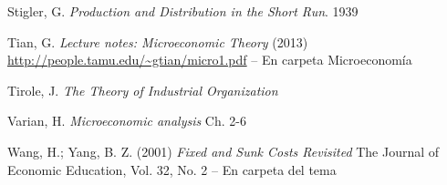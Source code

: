 \documentclass{nuevotema}
\begin{document}
Stigler, G. \textit{Production and Distribution in the Short Run}. 1939

Tian, G. \textit{Lecture notes: Microeconomic Theory} (2013) \url{http://people.tamu.edu/~gtian/micro1.pdf} -- En carpeta Microeconomía

Tirole, J. \textit{The Theory of Industrial Organization}

Varian, H. \textit{Microeconomic analysis} Ch. 2-6

Wang, H.; Yang, B. Z. (2001) \textit{Fixed and Sunk Costs Revisited} The Journal of Economic Education, Vol. 32, No. 2 -- En carpeta del tema
\end{document}
